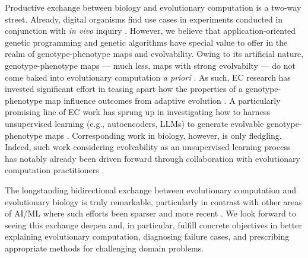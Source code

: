 Productive exchange between biology and evolutionary computation is a two-way street.
Already, digital organisms find use cases in experiments conducted in conjunction with \textit{in vivo} inquiry \citep{sanjun2007selection,wilke2001evolution,hindr2012new}.
However, we believe that application-oriented genetic programming and genetic algorithms have special value to offer in the realm of genotype-phenotype maps and evolvability.
Owing to its artificial nature, genotype-phenotype maps --- much less, maps with strong evolvabilty --- do not come baked into evolutionary computation \textit{a priori} \citep{kirschner1998evolvability}.
As such, EC research has invested significant effort in teasing apart how the properties of a genotype-phenotype map influence outcomes from adaptive evolution \citep{banzhaf1994genotype,hu2010evolvability,whigham2017mapping}.
A particularly promising line of EC work has sprung up in investigating how to harness unsupervised learning (e.g., autoencoders, LLMs) to generate evolvable genotype-phenotype maps \citep{lehman2023evolution,moreno2018learning,bentley2022evolving,gaier2020discovering,wittenberg2023denoising}.
Corresponding work in biology, however, is only fledgling.
Indeed, such work considering evolvability as an unsupervised learning process has notably already been driven forward through collaboration with evolutionary computation practitioners \citep{kouvaris2017evolution,szilagyi2020phenotypes}.

The longstanding bidirectional exchange between evolutionary computation and evolutionary biology is truly remarkable, particularly in contrast with other areas of AI/ML where such efforts been sparser and more recent \citep{marblestone2016toward,richards2019deep}.
We look forward to seeing this exchange deepen and, in particular, fulfill concrete objectives in better explaining evolutionary computation, diagnosing failure cases, and prescribing appropriate methods for challenging domain problems.
